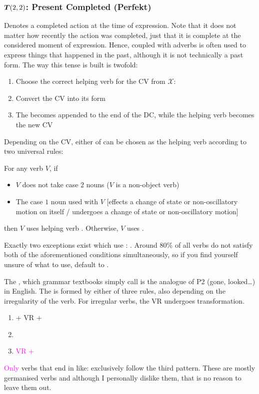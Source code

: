 \subsubsection{$\boldsymbol{T}(2,2)$: Present Completed (Perfekt)}
Denotes a completed action at the time of expression. Note that it does not matter how recently the action was completed, just that it is complete at the considered  moment of expression. Hence,  coupled with adverbs is often  used to express things that happened in the past, although it is not technically a past form. The way this tense is built is twofold:
\begin{enumerate}
    \item Choose the correct  helping verb for the CV from $\mathcal{X}$: 
    \item Convert the CV into its  form
    \item The  becomes appended to the end of the DC, while the helping verb becomes the new CV
\end{enumerate}
Depending on the CV, either of  can be chosen as the helping verb according to two universal rules:
\begin{syntax}
    For any verb $V$, if
    \begin{itemize}
        \item $V$ does not take case $2$ nouns ($V$ is a non-object verb) 
        \item The case $1$ noun used with $V$ [effects a change of state or non-oscillatory motion on itself / undergoes a change of state or non-oscillatory motion]
    \end{itemize}
    then $V$ uses helping verb . Otherwise, $V$  uses .
\end{syntax}
Exactly two exceptions exist which use : .  Around 80\% of all verbs do not satisfy both of the aforementioned conditions simultaneously, so if you find yourself  unsure of what to use, default to .

The , which  grammar textbooks simply call  is the analogue of P2 (gone, looked\ldots) in English. The  is formed by either of three rules, also depending on the irregularity of the verb. For irregular verbs, the VR undergoes transformation.
\begin{enumerate}
    \item {} + VR + 
    \item {}
    \item \textcolor{magenta}{VR + }
\end{enumerate}
\textcolor{magenta}{Only} verbs that end in  like:  exclusively follow the third pattern. These are mostly germanised verbs and although I personally dislike them, that is no reason to leave them out.

